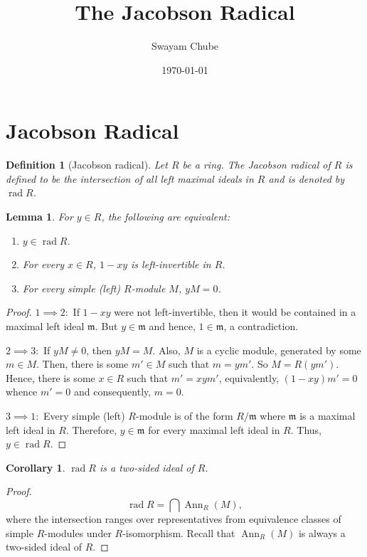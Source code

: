 \documentclass[12pt]{article}
\title{The Jacobson Radical}
\author{Swayam Chube}
\date{\today}
\theoremstyle{thmstyle}
\newtheorem{lemma}[theorem]{Lemma}
\theoremstyle{defstyle}
\newtheorem{definition}[theorem]{Definition}
\newtheorem*{corollary}{Corollary}
\newcommand{\Ann}{\operatorname{Ann}}
\newcommand{\frakm}{\mathfrak{m}} %
\newcommand{\rad}{\operatorname{rad}}
\begin{document}
\maketitle

\section{Jacobson Radical}

\begin{definition}[Jacobson radical]
    Let $R$ be a ring. The \emph{Jacobson radical} of $R$ is defined to be the intersection of all left maximal ideals in $R$ and is denoted by $\rad R$.
\end{definition}

\begin{lemma}
    For $y\in R$, the following are equivalent: 
    \begin{enumerate}[label=(\arabic*)]
        \item $y\in\rad R$.
        \item For every $x\in R$, $1 - xy$ is left-invertible in $R$.
        \item For every simple (left) $R$-module $M$, $yM = 0$.
    \end{enumerate}
\end{lemma}
\begin{proof}
    $1\implies 2:$ If $1 - xy$ were not left-invertible, then it would be contained in a maximal left ideal $\frakm$. But $y\in\frakm$ and hence, $1\in\frakm$, a contradiction. 

    $2\implies 3:$ If $yM\ne 0$, then $yM = M$. Also, $M$ is a cyclic module, generated by some $m\in M$. Then, there is some $m'\in M$ such that $m = ym'$. So $M = R(ym')$. Hence, there is some $x\in R$ such that $m' = xym'$, equivalently, $(1 - xy)m' = 0$ whence $m' = 0$ and consequently, $m = 0$.

    $3\implies 1:$ Every simple (left) $R$-module is of the form $R/\frakm$ where $\frakm$ is a maximal left ideal in $R$. Therefore, $y\in\frakm$ for every maximal left ideal in $R$. Thus, $y\in\rad R$. 
\end{proof}

\begin{corollary}
    $\rad R$ is a two-sided ideal of $R$.
\end{corollary}
\begin{proof}
    \begin{equation*}
        \rad R = \bigcap\Ann_R(M),
    \end{equation*}
    where the intersection ranges over representatives from equivalence classes of simple $R$-modules under $R$-isomorphism. Recall that $\Ann_R(M)$ is always a two-sided ideal of $R$.
\end{proof}
\end{document}
